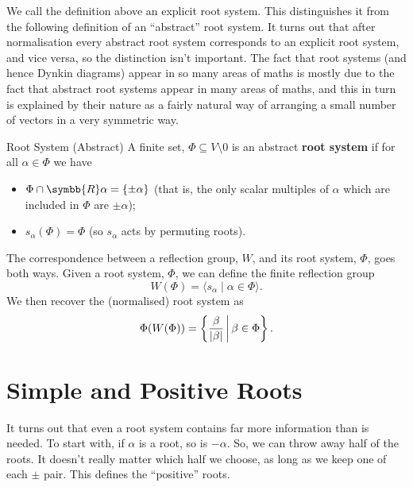 \documentclass[fleqn, a4paper, openany]{memoir}
\newcommand{\define}[1]{\textbf{#1}}
\newcommand{\reals}{\symbb{R}}
\DeclarePairedDelimiter{\abs}{\lvert}{\rvert}
\begin{document}
    We call the definition above an explicit root system.
    This distinguishes it from the following definition of an \enquote{abstract} root system.
    It turns out that after normalisation every abstract root system corresponds to an explicit root system, and vice versa, so the distinction isn't important.
    The fact that root systems (and hence Dynkin diagrams) appear in so many areas of maths is mostly due to the fact that abstract root systems appear in many areas of maths, and this in turn is explained by their nature as a fairly natural way of arranging a small number of vectors in a very symmetric way.
    
    \begin{dfn}{Root System (Abstract)}{}
        A finite set, \(\Phi \subseteq V \setminus 0\) is an abstract \define{root system} if for all \(\alpha \in \Phi\) we have
        \begin{itemize}
            \item \(\Phi \cap \reals \alpha = \{\pm \alpha\}\) (that is, the only scalar multiples of \(\alpha\) which are included in \(\Phi\) are \(\pm \alpha\));
            \item \(s_\alpha(\Phi) = \Phi\) (so \(s_\alpha\) acts by permuting roots).
        \end{itemize}
    \end{dfn}
    
    The correspondence between a reflection group, \(W\), and its root system, \(\Phi\), goes both ways.
    Given a root system, \(\Phi\), we can define the finite reflection group
    \begin{equation}
        W(\Phi) = \langle s_\alpha \mid \alpha \in \Phi \rangle.
    \end{equation}
    We then recover the (normalised) root system as
    \begin{equation}
        \Phi(W(\Phi)) = \left\{ \frac{\beta}{\abs{\beta}} \,\middle\vert\, \beta \in \Phi \right\}.
    \end{equation}
    
    \section{Simple and Positive Roots}
    It turns out that even a root system contains far more information than is needed.
    To start with, if \(\alpha\) is a root, so is \(-\alpha\).
    So, we can throw away half of the roots.
    It doesn't really matter which half we choose, as long as we keep one of each \(\pm\) pair.
    This defines the \enquote{positive} roots.
    
\end{document}
